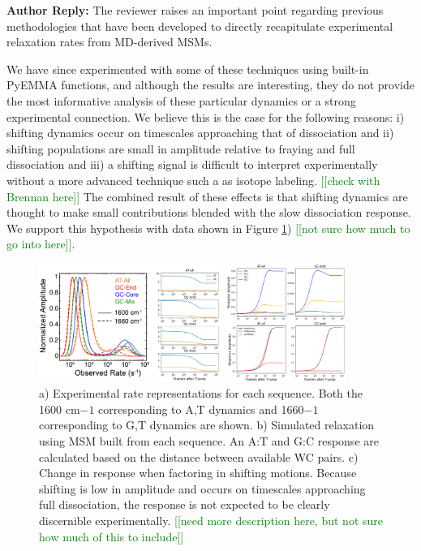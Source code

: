 \documentclass[11pt,a4paper]{letter} %
\newcommand*{\noteg}[1]{\textcolor{green}{[[#1]]}}		%
\begin{document}
\textbf{Author Reply:}   The reviewer raises an important point regarding previous methodologies that have been developed to directly recapitulate experimental relaxation rates from MD-derived MSMs.

We have since experimented with some of these techniques using built-in PyEMMA functions, and although the results are interesting, they do not provide the most informative analysis of these particular dynamics or a strong experimental connection. We believe this is the case for the following reasons: i) shifting dynamics occur on timescales approaching that of dissociation and ii) shifting populations are small in amplitude relative to fraying and full dissociation and iii) a shifting signal is difficult to interpret experimentally without a more advanced technique such a as isotope labeling. \noteg{check with Brennan here} The combined result of these effects is that shifting dynamics are thought to make small contributions blended with the slow dissociation response. We support this hypothesis with data shown in Figure \ref{fig:responses_all}) \noteg{not sure how much to go into here}.

\begin{figure}[ht!]
	\begin{center}
        \includegraphics[width=100mm]{cover_letter/revision_figures/responses_all.png}
        \caption{a) Experimental rate representations for each sequence. Both the 1600 cm$-1$ corresponding to A,T dynamics and 1660$-1$ corresponding to G,T dynamics are shown. b) Simulated relaxation using MSM built from each sequence. An A:T and G:C response are calculated based on the distance between available WC pairs. c) Change in response when factoring in shifting motions. Because shifting is low in amplitude and occurs on timescales approaching full dissociation, the response is not expected to be clearly discernible experimentally.  \noteg{need more description here, but not sure how much of this to include} }
        \label{fig:responses_all}
	\end{center}
\end{figure}
\end{document}
